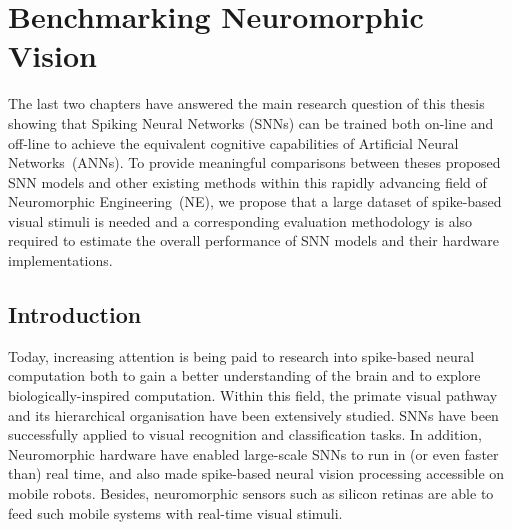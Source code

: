 \chapter{Benchmarking Neuromorphic Vision}
\label{cha:bench}


The last two chapters have answered the main research question of this thesis showing that Spiking Neural Networks (SNNs) can be trained both on-line and off-line to achieve the equivalent cognitive capabilities of Artificial Neural Networks~(ANNs).
To provide meaningful comparisons between theses proposed SNN models and other existing methods within this rapidly advancing field of Neuromorphic Engineering~(NE), we propose that a large dataset of spike-based visual stimuli is needed and a corresponding evaluation methodology is also required to estimate the overall performance of SNN models and their hardware implementations.

%
\section{Introduction}
\label{sec:chapt6_intro}
Today, increasing attention is being paid to research into spike-based neural computation both to gain a better understanding of the brain and to explore biologically-inspired computation.
Within this field, the primate visual pathway and its hierarchical organisation have been extensively studied.
SNNs have been successfully applied to visual recognition and classification tasks.
In addition, Neuromorphic hardware have enabled large-scale SNNs to run in (or even faster than) real time, and also made spike-based neural vision processing accessible on mobile robots.
Besides, neuromorphic sensors such as silicon retinas are able to feed such mobile systems with real-time visual stimuli.

